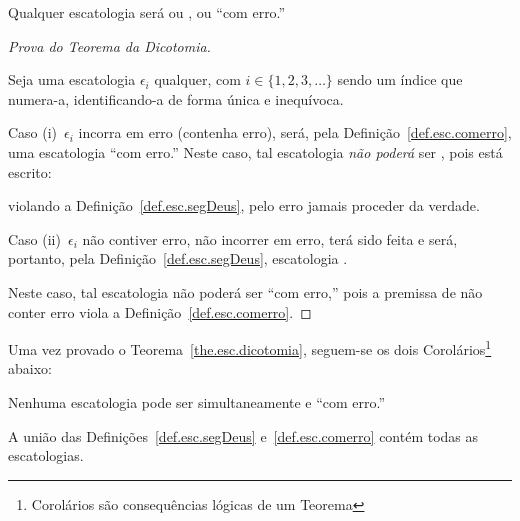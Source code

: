     \begin{THE}[Dicotomia]
        \label{the.esc.dicotomia}
        Qualquer escatologia será ou , ou ``com erro.''
    \end{THE}

    \begin{proof}[Prova do Teorema da Dicotomia]
        \label{pro.the.dicotomia}

        Seja uma escatologia $\epsilon_i$ qualquer, com $i \in \{1, 2, 3, \ldots\}$ sendo um  índice  que  numera-a,
        identificando-a de forma única e inequívoca.

        Caso (i)~$\epsilon_i$ incorra em erro  (contenha  erro),  será,  pela  Definição~\ref{def.esc.comerro},  uma
        escatologia ``com erro.'' Neste caso, tal escatologia \emph{não poderá} ser , pois está
        escrito:


        \noindent violando a Definição~\ref{def.esc.segDeus}, pelo erro jamais proceder da verdade.

        Caso (ii)~$\epsilon_i$ não contiver erro, não incorrer em erro, terá sido feita     e     será,     portanto,     pela
        Definição~\ref{def.esc.segDeus}, escatologia .

        Neste caso, tal escatologia não poderá ser ``com erro,'' pois a premissa de não conter erro viola a
        Definição~\ref{def.esc.comerro}.

    \end{proof}

    Uma vez provado o Teorema~\ref{the.esc.dicotomia}, seguem-se os dois Corolários\footnote{Corolários são consequências
    lógicas de um Teorema} abaixo:

    \begin{COR}
        \label{cor.dicotomia.1}
        Nenhuma escatologia pode ser simultaneamente  e ``com erro.''
    \end{COR}

    \begin{COR}
        \label{cor.dicotomia.2}
        A união das Definições~\ref{def.esc.segDeus} e~\ref{def.esc.comerro} contém todas as escatologias.
    \end{COR}

